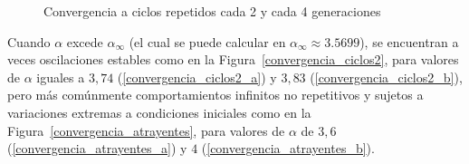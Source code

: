 \documentclass[letterpaper, 11pt, oneside]{article}
\theoremstyle{definition}
\theoremstyle{remark}
\begin{document}
\begin{itemize}
\begin{figure}[h!]
	\centering
	\hspace{0cm}
	\caption{Convergencia a ciclos repetidos cada 2 y cada 4 generaciones}
	\label{convergencia_ciclos}
\end{figure}
\newpage
Cuando $\alpha$ excede $\alpha_{\infty}$ (el cual se puede calcular en $\alpha_{\infty} \approx 3.5699 $), se encuentran a veces oscilaciones estables como en la Figura~\ref{convergencia_ciclos2}, para valores de $\alpha$ iguales a $3,74$ (\ref{convergencia_ciclos2_a}) y $3,83$ (\ref{convergencia_ciclos2_b}), pero más comúnmente comportamientos infinitos no repetitivos y sujetos a variaciones extremas a condiciones iniciales como en la Figura~\ref{convergencia_atrayentes}, para valores de $\alpha$ de $3,6$ (\ref{convergencia_atrayentes_a}) y $4$ (\ref{convergencia_atrayentes_b}). 


\end{itemize}
\end{document}

